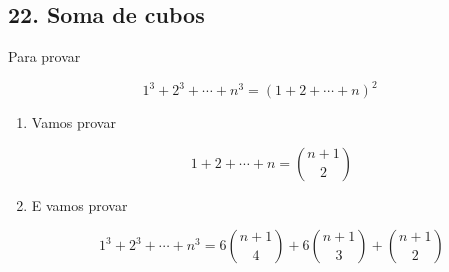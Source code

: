 \documentclass[
  11pt]{report}
\begin{document}
\hypertarget{soma-de-cubos}{%
\subsection*{22. Soma de cubos}\label{soma-de-cubos}}

\begin{rmdbox}

Para provar

\[
1^3 + 2^3 + \cdots + n^3 = (1 + 2 + \cdots + n)^2
\]

\begin{enumerate}
\def\labelenumi{\alph{enumi}.}
\item
  Vamos provar

  \[
  1 + 2 + \cdots + n = \binom{n+1}{2}
  \]
\item
  E vamos provar

  \[
  1^3 + 2^3 + \cdots + n^3 = 
  6\binom{n+1}{4} + 6\binom{n+1}{3} + \binom{n+1}{2}
  \]
\end{enumerate}

\end{rmdbox}
\end{document}
